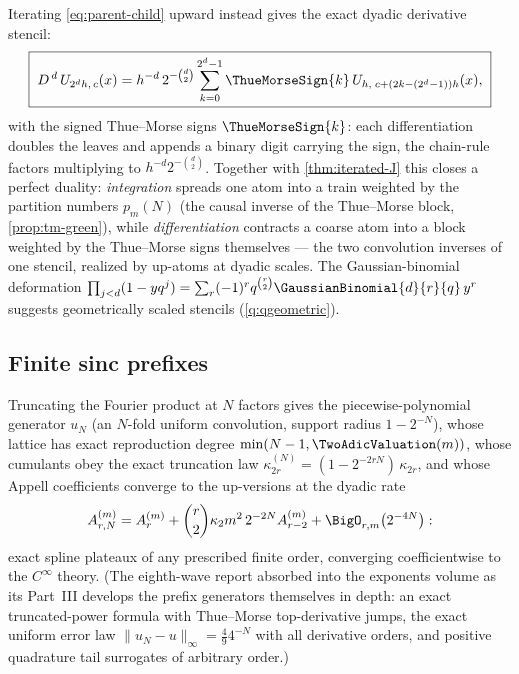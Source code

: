 \documentclass[11pt,oneside]{article}
\numberwithin{equation}{section}
\theoremstyle{definition}
\theoremstyle{remark}
\begin{document}
Iterating \eqref{eq:parent-child} upward instead gives the exact
dyadic derivative stencil:
\begin{equation}
 \boxed{\;
 D^{\,d}\,U_{2^{d}h,\,c}(x)
 =h^{-d}\,2^{-\binom d2}
 \sum_{k=0}^{2^{d}-1}\ThueMorseSign{k}\,
 U_{h,\;c+(2k-(2^{d}-1))h}(x),
 \;}
 \label{eq:tm-stencil}
\end{equation}
with the signed Thue--Morse signs $\ThueMorseSign{k}$: each differentiation
doubles the leaves and appends a binary digit carrying the sign, the
chain-rule factors multiplying to $h^{-d}2^{-\binom d2}$.  Together
with \cref{thm:iterated-J} this closes a perfect duality:
\emph{integration} spreads one atom into a train weighted by the
partition numbers $p_m(N)$ (the causal inverse of the Thue--Morse
block, \cref{prop:tm-green}), while \emph{differentiation} contracts
a coarse atom into a block weighted by the Thue--Morse signs
themselves --- the two convolution inverses of one stencil, realized
by up-atoms at dyadic scales.  The Gaussian-binomial deformation
$\prod_{j<d}(1-yq^{j})
=\sum_r(-1)^{r}q^{\binom r2}\GaussianBinomial{d}{r}{q}\,y^{r}$
suggests geometrically scaled stencils
(\cref{q:qgeometric}).

\subsection{Finite sinc prefixes}

Truncating the Fourier product at $N$ factors gives the
piecewise-polynomial generator $u_N$ (an $N$-fold uniform
convolution, support radius $1-2^{-N}$), whose lattice has exact
reproduction degree $\min(N-1,\TwoAdicValuation(m))$, whose cumulants obey the
exact truncation law
$\kappa^{(N)}_{2r}=(1-2^{-2rN})\,\kappa_{2r}$, and whose Appell
coefficients converge to the up-versions at the dyadic rate
\begin{equation}
 A^{(m)}_{r,N}=A^{(m)}_r
 +\binom r2\kappa_2m^{2}\,2^{-2N}A^{(m)}_{r-2}
 +\BigO_{r,m}\bigl(2^{-4N}\bigr):
 \label{eq:finite-appell}
\end{equation}
exact spline plateaux of any prescribed finite order, converging
coefficientwise to the $C^\infty$ theory.  (The eighth-wave report
absorbed into the exponents volume as its Part~III develops the
prefix generators themselves in depth: an exact truncated-power
formula with Thue--Morse top-derivative jumps, the exact uniform
error law $\lVert u_N-u\rVert_\infty=\tfrac{4}{9}4^{-N}$ with all
derivative orders, and positive quadrature tail surrogates of
arbitrary order.)
\end{document}
